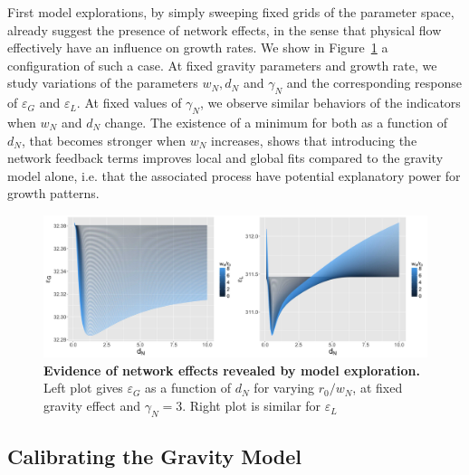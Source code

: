 \documentclass{article}
\begin{document}
First model explorations, by simply sweeping fixed grids of the parameter space, already suggest the presence of network effects, in the sense that physical flow effectively have an influence on growth rates. We show in Figure~\ref{fig:networkeffects} a configuration of such a case. At fixed gravity parameters and growth rate, we study variations of the parameters $w_N, d_N$ and $\gamma_N$ and the corresponding response of $\varepsilon_G$ and $\varepsilon_L$. At fixed values of $\gamma_N$, we observe similar behaviors of the indicators when $w_N$ and $d_N$ change. The existence of a minimum for both as a function of $d_N$, that becomes stronger when $w_N$ increases, shows that introducing the network feedback terms improves local and global fits compared to the gravity model alone, i.e. that the associated process have potential explanatory power for growth patterns.


\begin{figure}
\centering
\includegraphics[width=\textwidth]{Fig3.jpg}
\caption{\textbf{Evidence of network effects revealed by model exploration.} Left plot gives $\varepsilon_G$ as a function of $d_N$ for varying $r_0/w_N$, at fixed gravity effect and $\gamma_N=3$. Right plot is similar for $\varepsilon_L$}
\label{fig:networkeffects}
\end{figure}





\subsection*{Calibrating the Gravity Model}
\end{document}
